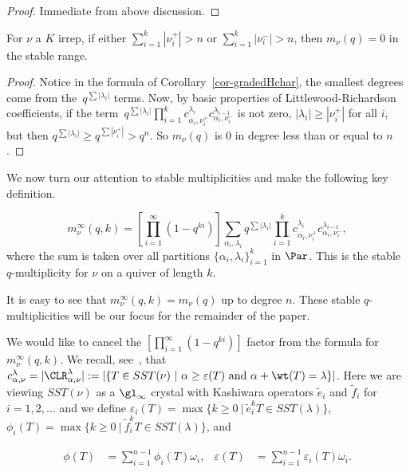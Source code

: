 \begin{proof}
    Immediate from above discussion.
\end{proof}

\begin{cor}
    For $\nu$ a $K$ irrep, if either $\sum_{i=1}^k |\nu_i^+| > n$ or $\sum_{i=1}^k |\nu_i^-| > n$, then $m_\nu(q) = 0$ in the stable range.
\end{cor}

\begin{proof}
    Notice in the formula of Corollary~\ref{cor-gradedHchar}, the smallest degrees come from the~$q^{\sum |\lambda_i|}$ terms. Now, by basic properties of Littlewood-Richardson coefficients, if the term~$q^{\sum |\lambda_i|}\prod_{i=1}^k
    c^{\lambda_i}_{\alpha_i, \nu_i^+} c^{\lambda_{i-1}}_{\alpha_i, \nu_i^-}$ is not zero, $|\lambda_i| \geq |\nu_i^+|$ for all $i$, but then $q^{\sum |\lambda_i|} \geq q^{\sum |\nu_i^+|} > q^{n}$. So $m_\nu(q)$ is 0 in degree less than or equal to $n$.
\end{proof}

We now turn our attention to stable multiplicities and make the following key definition.
\begin{defn}
    $$m_\nu^\infty(q,k) = [\prod_{i=1}^\infty(1-q^{ki})]\sum_{\alpha_i, \lambda_i} q^{\sum |\lambda_i|}\prod_{i=1}^k
    c^{\lambda_i}_{\alpha_i, \nu_i^+} c^{\lambda_{i-1}}_{\alpha_i, \nu_i^-},$$
    where the sum is taken over all partitions $\{\alpha_i, \lambda_i\}_{i=1}^k$ in $\Par$. This is the stable $q$-multiplicity for $\nu$ on a quiver of length $k$.
\end{defn}

It is easy to see that $m_\nu^\infty(q,k) = m_\nu(q)$ up to degree $n$. These stable $q$-multiplicities will be our focus for the remainder of the paper.

We would like to cancel the $[\prod_{i=1}^\infty(1-q^{ki})]$ factor from the formula for $m_\nu^\infty(q,k)$. We recall, see~\cite{frohmader2023graded}, that $c^{\lambda}_{\alpha, \nu} = |\CLR^\lambda_{\alpha, \nu}| := |\{T \in SST(\nu) \ | \ \alpha \geq \varepsilon(T) \text{ and } \alpha + \wt(T) = \lambda \}|$. Here we are viewing $SST(\nu)$ as a $\gl_\infty$ crystal with Kashiwara operators $\tilde{e}_i$ and $\tilde{f}_i$ for~$i = 1, 2, \dots $ and we define $\varepsilon_i(T) = \max \{ k \geq 0 \ | \ \tilde{e}_i^k T \in SST(\lambda) \}$, $\phi_i(T) = \max \{ k \geq 0 \ | \ \tilde{f}_i^k T \in SST(\lambda) \}$, and 

\begin{align*}
\phi(T) &= \sum_{i=1}^{n-1}\phi_i(T)\omega_i,   &   \varepsilon(T) &= \sum_{i=1}^{n-1}\varepsilon_i(T)\omega_i.    
\end{align*}

